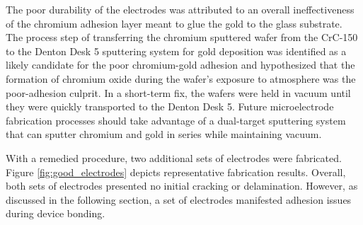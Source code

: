 \par The poor durability of the electrodes was attributed to an overall ineffectiveness of the chromium adhesion layer meant to glue the gold to the glass substrate. The process step of transferring the chromium sputtered wafer from the CrC-150 to the Denton Desk 5 sputtering system for gold deposition was identified as a likely candidate for the poor chromium-gold adhesion and hypothesized that the formation of chromium oxide during the wafer's exposure to atmosphere was the poor-adhesion culprit. In a short-term fix, the wafers were held in vacuum until they were quickly transported to the Denton Desk 5. Future microelectrode fabrication processes should take advantage of a dual-target sputtering system that can sputter chromium and gold in series while maintaining vacuum.  

\par With a remedied procedure, two additional sets of electrodes were fabricated. Figure \ref{fig:good_electrodes} depicts representative fabrication results. Overall, both sets of electrodes presented no initial cracking or delamination. However, as discussed in the following section, a set of electrodes manifested adhesion issues during device bonding.

